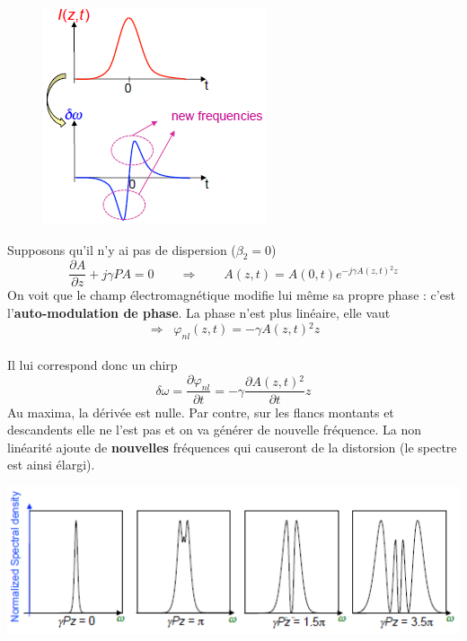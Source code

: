 \begin{figure}
	\vspace{-5mm}
	\includegraphics[scale=0.65]{ch6/image31}
	\end{figure}
Supposons qu'il n'y ai pas de dispersion ($\beta_2=0$)
\begin{equation}
\frac{{\partial A}}{{\partial z}} + j\gamma PA = 0\qquad\Rightarrow\qquad
A(z,t) = A(0,t){e^{ - j\gamma A(z,t){^2}z}}
\end{equation}
On voit que le champ électromagnétique modifie lui même sa propre phase : c'est 
l'\textbf{auto-modulation de phase}. La phase n'est plus linéaire, elle vaut
\begin{equation}
 \Rightarrow \;\;{\varphi _{nl}}(z,t) =  - \gamma A(z,t){^2}z
\end{equation}\ \\

Il lui correspond donc un chirp
\begin{equation}
\delta \omega  = \frac{{\partial {\varphi _{nl}}}}{{\partial t}} =  - \gamma \frac{{\partial A(z,t){^2}}}{{\partial t}}z
\end{equation}
Au maxima, la dérivée est nulle. Par contre, sur les flancs montants et descandents elle ne l'est pas
et on va générer de nouvelle fréquence. La non linéarité ajoute de \textbf{nouvelles} fréquences 
qui causeront de la distorsion (le spectre est ainsi élargi).

\begin{center}
	\includegraphics[scale=0.65]{ch6/image32}
\end{center}

